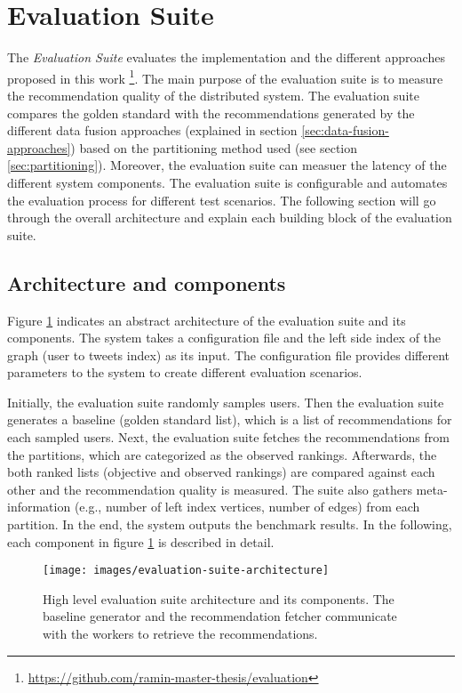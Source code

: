\section{Evaluation Suite}
\label{sec:evaluation-suite}
The \emph{Evaluation Suite} evaluates the implementation and the different approaches proposed in this work \footnote{\url{https://github.com/ramin-master-thesis/evaluation}}. The main purpose of the evaluation suite is to measure the recommendation quality of the distributed system. The evaluation suite compares the golden standard with the recommendations generated by the different data fusion approaches (explained in section \ref{sec:data-fusion-approaches}) based on the partitioning method used (see section \ref{sec:partitioning}). Moreover, the evaluation suite can measuer the latency of the different system components. The evaluation suite is configurable and automates the evaluation process for different test scenarios. The following section will go through the overall architecture and explain each building block of the evaluation suite.


\subsection{Architecture and components}
\label{sec:eval-suite-architecture-components}
Figure \ref{fig:evaluation-suite-architecture} indicates an abstract architecture of the evaluation suite and its components. The system takes a configuration file and the left side index of the graph (user to tweets index) as its input. The configuration file provides different parameters to the system to create different evaluation scenarios. 


Initially, the evaluation suite randomly samples users. Then the evaluation suite generates a baseline (golden standard list), which is a list of recommendations for each sampled users. Next, the evaluation suite fetches the recommendations from the partitions, which are categorized as the observed rankings. Afterwards, the both ranked lists (objective and observed rankings) are compared against each other and the recommendation quality is measured. The suite also gathers meta-information (e.g., number of left index vertices, number of edges) from each partition. In the end, the system outputs the benchmark results. In the following, each component in figure \ref{fig:evaluation-suite-architecture} is described in detail.


\begin{figure}[!htb]
    \centering
    \texttt{[image: images/evaluation-suite-architecture]}
    \caption{High level evaluation suite architecture and its components. The baseline generator and the recommendation fetcher communicate with the workers to retrieve the recommendations.}
    \label{fig:evaluation-suite-architecture}
\end{figure}


